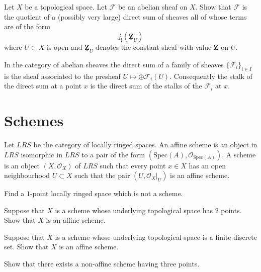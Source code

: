 \begin{exercise}
\label{exercise-quotient-j-shriek-Z}
Let $X$ be a topological space.
Let ${\mathcal F}$ be an abelian sheaf on $X$. Show
that ${\mathcal F}$ is the quotient of a (possibly very large) direct sum
of sheaves all of whose terms are of the form
$$
j_{!}(\underline{{\mathbf Z}}_U)
$$
where $U \subset X$ is open and $\underline{{\mathbf Z}}_U$ denotes the
constant sheaf with value ${\mathbf Z}$ on $U$.
\end{exercise}

\begin{remark}
\label{remark-direct-sum-stalk-abelian}
In the category of abelian sheaves the direct sum of
a family of sheaves $\{{\mathcal F}_i\}_{i\in I}$ is the sheaf associated to
the presheaf $U \mapsto \oplus {\mathcal F}_i(U)$. Consequently the stalk of
the direct sum at a point $x$ is the direct sum of the stalks of the
${\mathcal F}_i$ at $x$.
\end{remark}

\section{Schemes}
\label{section-schemes}

\noindent
Let $LRS$ be the category of locally ringed spaces.
An affine scheme is an object in $LRS$ isomorphic in $LRS$ to
a pair of the form $(\text{Spec}(A), {\mathcal O}_{\text{Spec}(A)})$.
A scheme is an
object $(X, {\mathcal O}_X)$ of $LRS$ such that every point $x\in X$
has an open neighbourhood $U \subset X$ such that the pair
$(U, {\mathcal O}_X|_U)$ is an affine scheme.

\begin{exercise}
\label{exercise-one-point}
Find a $1$-point locally ringed space which is not a scheme.
\end{exercise}

\begin{exercise}
\label{exercise-two-points}
Suppose that $X$ is a scheme whose underlying
topological space has 2 points. Show that $X$ is an affine scheme.
\end{exercise}

\begin{exercise}
\label{exercise-discrete-finite-set-points}
Suppose that $X$ is a scheme whose underlying topological space is a
finite discrete set. Show that $X$ is an affine scheme.
\end{exercise}

\begin{exercise}
\label{exercise-three-points}
Show that there exists a non-affine scheme having three points.
\end{exercise}

